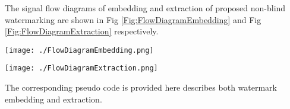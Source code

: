  The signal flow diagrams of embedding and extraction of proposed non-blind watermarking are shown in Fig \ref{Fig:FlowDiagramEmbedding} and Fig \ref{Fig:FlowDiagramExtraction} respectively.
   
\begin{figure*}
	\centering
	\texttt{[image: ./FlowDiagramEmbedding.png]}
	\caption{Embedding signal flow diagram}
	\label{Fig:FlowDiagramEmbedding}
\end{figure*}

\begin{figure*}
	\centering
	\texttt{[image: ./FlowDiagramExtraction.png]}
	\caption{Extraction signal flow diagram}
	\label{Fig:FlowDiagramExtraction}
\end{figure*} 
 
The corresponding pseudo code is provided here describes both watermark embedding and extraction.
